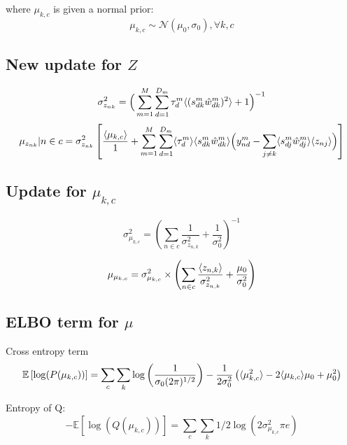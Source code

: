 \documentclass[10pt, a4paper,openany]{report}
\begin{document}
where $\mu_{k, c}$ is given a normal prior:
\begin{equation}
  \mu_{k, c} \sim \mathcal{N} (\mu_0, \sigma_0), \forall k, c
\end{equation}

\subsection{New update for $Z$}
\begin{equation*}
\sigma_{z_{nk}}^2 = \Big( \sum_{m=1}^{M} \sum_{d=1}^{D_m} \tau_d^m \langle (s_{dk}^m\hat{w}_{dk}^m)^2 \rangle + 1 \Big)^{-1}
\end{equation*}
\begin{equation*}
\mu_{z_{nk}} | n \in c = \sigma_{z_{nk}}^2 \left[ \frac{\langle \mu_{k,c} \rangle}{1} + \sum_{m=1}^{M} \sum_{d=1}^{D_m} \langle\tau_d^m\rangle \langle s_{dk}^m\hat{w}_{dk}^m \rangle \Big( y_{nd}^m - \sum_{j \neq k} \langle s_{dj}^m \hat{w}_{dj}^m \rangle \langle z_{nj} \rangle \Big)\right]
\end{equation*}


\subsection{Update for $\mu_{k, c}$}
\begin{equation*}
  \sigma^2_{\mu_{k, c}} = \left(\sum_{n\in c} \frac{1}{\sigma^2_{z_{n,k}}} + \frac{1}{\sigma_0^2}\right)^{-1}
\end{equation*}

\begin{equation*}
  \mu_{\mu_{k, c}} = \sigma^2_{\mu_{k, c}}\times \left( \sum_{n \in c} \frac{\langle z_{n,k} \rangle}{\sigma^2_{z_{n,k}}} + \frac{\mu_0}{\sigma^2_0} \right)
\end{equation*}

\subsection{ELBO term for $\mu$}
Cross entropy term
\begin{equation*}
  \mathbb{E}\left[ \log(P(\mu_{k, c}))\right] = \sum_c\sum_k \log\left(\frac{1}{\sigma_0 (2\pi)^{1/2}}\right) - \frac{1}{2\sigma^2_0}\left( \langle \mu_{k,c}^2\rangle -2\langle\mu_{k,c}\rangle\mu_0 + \mu_0^2 \right)
\end{equation*}

Entropy of Q:
\begin{equation*}
  -\mathbb{E}\left[ \log(Q(\mu_{k, c}))\right] =\sum_c\sum_k 1/2\log(2\sigma^2_{\mu_{k, c}} \pi e)
\end{equation*}
\end{document}
